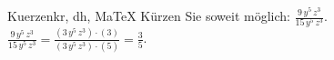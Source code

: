 \begin{MAufgabe}{Kuerzen}{kr, dh, MaTeX}
K\"urzen Sie soweit m\"oglich: $\frac{9\, y^5\, z^3}{15\, y^5\, z^3}$.\\ 
\ifLsg\MLoesung
\quad $\frac{9\, y^5\, z^3}{15\, y^5\, z^3}=\frac{(3\, y^5\, z^3)\cdot(3)}{(3\, y^5\, z^3)\cdot(5)}=\frac{3}{5}$.\else\relax\fi
 \end{MAufgabe}